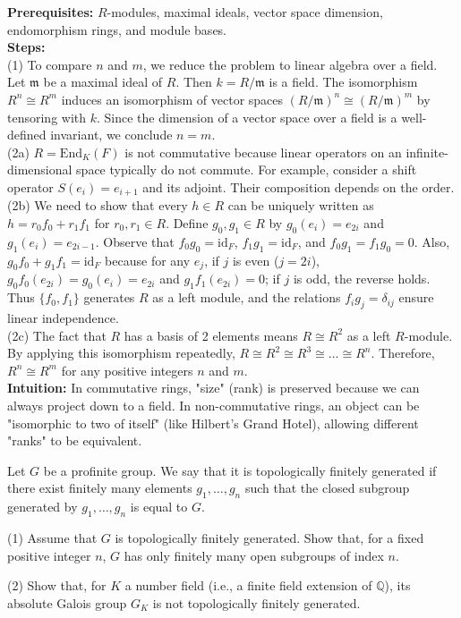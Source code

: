 \begin{solution}
\textbf{Prerequisites:} $R$-modules, maximal ideals, vector space dimension, endomorphism rings, and module bases. \\[2ex]

\textbf{Steps:} \\[2ex]
(1) To compare $n$ and $m$, we reduce the problem to linear algebra over a field. Let $\mathfrak{m}$ be a maximal ideal of $R$. Then $k = R/\mathfrak{m}$ is a field. The isomorphism $R^n \cong R^m$ induces an isomorphism of vector spaces $(R/\mathfrak{m})^n \cong (R/\mathfrak{m})^m$ by tensoring with $k$. Since the dimension of a vector space over a field is a well-defined invariant, we conclude $n = m$. \\[2ex]

(2a) $R = \mathrm{End}_K(F)$ is not commutative because linear operators on an infinite-dimensional space typically do not commute. For example, consider a shift operator $S(e_i) = e_{i+1}$ and its adjoint. Their composition depends on the order. \\[2ex]

(2b) We need to show that every $h \in R$ can be uniquely written as $h = r_0 f_0 + r_1 f_1$ for $r_0, r_1 \in R$. Define $g_0, g_1 \in R$ by $g_0(e_i) = e_{2i}$ and $g_1(e_i) = e_{2i-1}$. Observe that $f_0 g_0 = \text{id}_F$, $f_1 g_1 = \text{id}_F$, and $f_0 g_1 = f_1 g_0 = 0$. Also, $g_0 f_0 + g_1 f_1 = \text{id}_F$ because for any $e_j$, if $j$ is even ($j=2i$), $g_0 f_0(e_{2i}) = g_0(e_i) = e_{2i}$ and $g_1 f_1(e_{2i}) = 0$; if $j$ is odd, the reverse holds. Thus $\{f_0, f_1\}$ generates $R$ as a left module, and the relations $f_i g_j = \delta_{ij}$ ensure linear independence. \\[2ex]

(2c) The fact that $R$ has a basis of 2 elements means $R \cong R^2$ as a left $R$-module. By applying this isomorphism repeatedly, $R \cong R^2 \cong R^3 \cong \dots \cong R^n$. Therefore, $R^n \cong R^m$ for any positive integers $n$ and $m$. \\[2ex]

\textbf{Intuition:} In commutative rings, "size" (rank) is preserved because we can always project down to a field. In non-commutative rings, an object can be "isomorphic to two of itself" (like Hilbert's Grand Hotel), allowing different "ranks" to be equivalent.
\end{solution}

\begin{exercise}
\label{algebra:2023:3}
Let $G$ be a profinite group. We say that it is topologically finitely generated if there exist finitely many elements $g_1, \ldots, g_n$ such that the closed subgroup generated by $g_1, \ldots, g_n$ is equal to $G$.

(1) Assume that $G$ is topologically finitely generated. Show that, for a fixed positive integer $n$, $G$ has only finitely many open subgroups of index $n$.

(2) Show that, for $K$ a number field (i.e., a finite field extension of $\mathbb{Q}$), its absolute Galois group $G_K$ is not topologically finitely generated.
\end{exercise}

